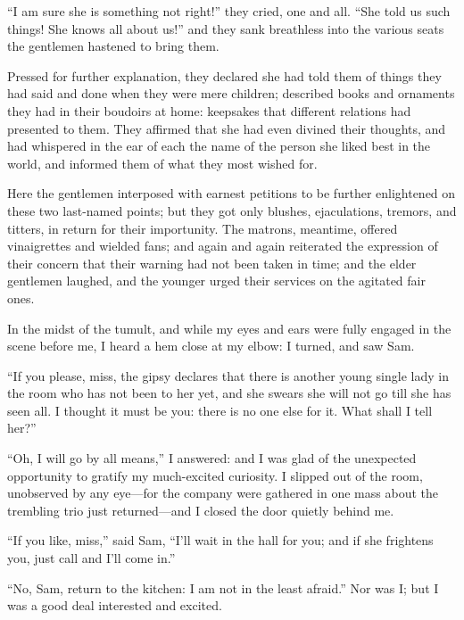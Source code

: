 \enquote{I am sure she is something not right!} they cried, one and
all. \enquote{She told us such things! She knows all about us!} and
they sank breathless into the various seats the gentlemen hastened to
bring them.

Pressed for further explanation, they declared she had told them of
things they had said and done when they were mere children; described
books and ornaments they had in their boudoirs at home: keepsakes that
different relations had presented to them. They affirmed that she had
even divined their thoughts, and had whispered in the ear of each the
name of the person she liked best in the world, and informed them of
what they most wished for.

Here the gentlemen interposed with earnest petitions to be further
enlightened on these two last-named points; but they got only blushes,
ejaculations, tremors, and titters, in return for their importunity.
The matrons, meantime, offered vinaigrettes and wielded fans; and again
and again reiterated the expression of their concern that their warning
had not been taken in time; and the elder gentlemen laughed, and the
younger urged their services on the agitated fair ones.

In the midst of the tumult, and while my eyes and ears were fully
engaged in the scene before me, I heard a hem close at my elbow: I
turned, and saw Sam.

\enquote{If you please, miss, the gipsy declares that there is another
	young single lady in the room who has not been to her yet, and she
	swears she will not go till she has seen all. I thought it must be you:
	there is no one else for it. What shall I tell her?}

\enquote{Oh, I will go by all means,} I answered: and I was glad of the
unexpected opportunity to gratify my much-excited curiosity. I slipped
out of the room, unobserved by any eye---for the company were gathered
in one mass about the trembling trio just returned---and I closed the
door quietly behind me.

\enquote{If you like, miss,} said Sam, \enquote{I'll wait in the hall
	for you; and if she frightens you, just call and I'll come in.}

\enquote{No, Sam, return to the kitchen: I am not in the least afraid.}
Nor was I; but I was a good deal interested and excited.
